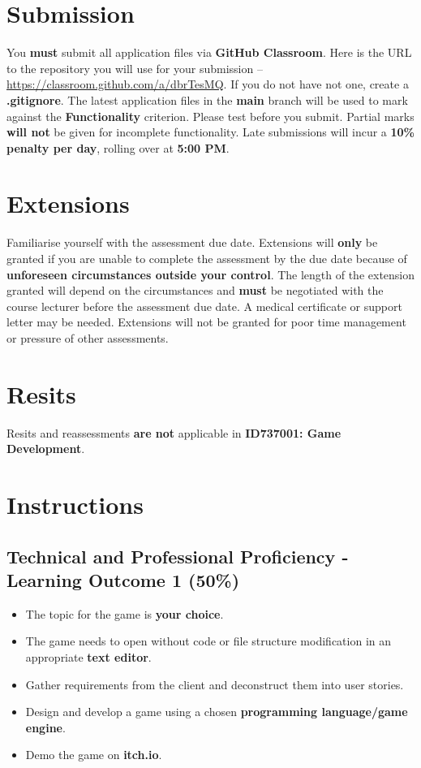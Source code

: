 \documentclass{article}
\begin{document}
\section*{Submission}
You \textbf{must} submit all application files via \textbf{GitHub Classroom}. Here is the URL to the repository you will use for your submission – \href{https://classroom.github.com/a/dbrTesMQ}{https://classroom.github.com/a/dbrTesMQ}. If you do not have not one, create a \textbf{.gitignore}. The latest application files in the \textbf{main} branch will be used to mark against the \textbf{Functionality} criterion. Please test before you submit. Partial marks \textbf{will not} be given for incomplete functionality. Late submissions will incur a \textbf{10\% penalty per day}, rolling over at \textbf{5:00 PM}.

\section*{Extensions}
Familiarise yourself with the assessment due date. Extensions will \textbf{only} be granted if you are unable to complete the assessment by the due date because of \textbf{unforeseen circumstances outside your control}. The length of the extension granted will depend on the circumstances and \textbf{must} be negotiated with the course lecturer before the assessment due date. A medical certificate or support letter may be needed. Extensions will not be granted for poor time management or pressure of other assessments.

\section*{Resits}
Resits and reassessments \textbf{are not} applicable in \textbf{ID737001: Game Development}.

\section*{Instructions}

\subsection*{Technical and Professional Proficiency - Learning Outcome 1 (50\%)}
\begin{itemize}
	 \item The topic for the game is \textbf{your choice}.  
	 \item The game needs to open without code or file structure modification in an appropriate \textbf{text editor}.
	 \item Gather requirements from the client and deconstruct them into user stories.
	 \item Design and develop a game using a chosen \textbf{programming language/game engine}.
	 \item Demo the game on \textbf{itch.io}.
\end{itemize}
\end{document}
